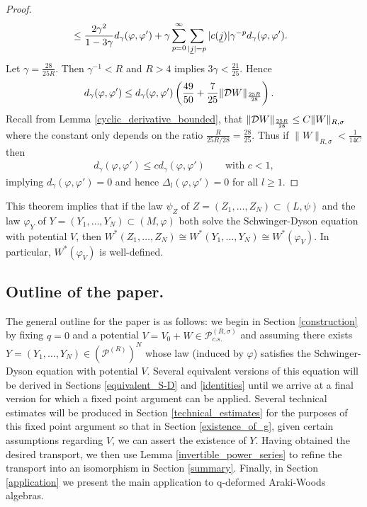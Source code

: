 \begin{proof}
\begin{align*}
				&\leq \frac{2\gamma^2}{1-3\gamma} d_\gamma(\varphi,\varphi') + \gamma\sum_{p=0}^\infty \sum_{|\underline{j}|=p} |c(\underline{j})| \gamma^{-p}d_\gamma(\varphi,\varphi').
	\end{align*}
Let $\gamma=\frac{28}{25 R}$. Then $\gamma^{-1}<R$ and $R>4$ implies $3\gamma<\frac{21}{25}$. Hence
	\begin{align*}
		d_\gamma(\varphi,\varphi')&\leq d_\gamma(\varphi,\varphi')\left(\frac{49}{50} + \frac{7}{25}\|\mathcal D W\|_{\frac{25R}{28}}\right).
	\end{align*}
Recall from Lemma \ref{cyclic_derivative_bounded}, that $\|\mathcal D W\|_{\frac{25R}{28}} \leq C\|W\|_{R,\sigma}$ where the constant only depends on the ratio $\frac{R}{25R/28}=\frac{28}{25}$. Thus if $\|W\|_{R,\sigma} <\frac{1}{14C}$ then
	\begin{align*}
		d_\gamma(\varphi,\varphi') \leq c d_\gamma(\varphi,\varphi')\qquad \text{with }c<1,
	\end{align*}
implying $d_\gamma(\varphi,\varphi')=0$ and hence $\Delta_l(\varphi,\varphi')=0$ for all $l\geq 1$.
\end{proof}

This theorem implies that if the law $\psi_Z$ of $Z=(Z_1,\ldots, Z_N)\subset (L,\psi)$ and the law $\varphi_Y$ of $Y=(Y_1,\ldots, Y_N)\subset (M,\varphi)$ both solve the Schwinger-Dyson equation with potential $V$, then $W^*(Z_1,\ldots, Z_N)\cong W^*(Y_1,\ldots, Y_N)\cong W^*(\varphi_V)$. In particular, $W^*(\varphi_V)$ is well-defined.


\subsection{Outline of the paper.}

The general outline for the paper is as follows: we begin in Section \ref{construction} by fixing $q=0$ and a potential $V=V_0+W\in \mathscr{P}^{(R,\sigma)}_{c.s.}$ and assuming there exists $Y=(Y_1,\ldots, Y_N)\in (\mathscr{P}^{(R)})^N$ whose law (induced by $\varphi$) satisfies the Schwinger-Dyson equation with potential $V$. Several equivalent versions of this equation will be derived in Sections \ref{equivalent_S-D} and \ref{identities} until we arrive at a final version for which a fixed point argument can be applied. Several technical estimates will be produced in Section \ref{technical_estimates} for the purposes of this fixed point argument so that in Section \ref{existence_of_g}, given certain assumptions regarding $V$, we can assert the existence of $Y$. Having obtained the desired transport, we then use Lemma \ref{invertible_power_series} to refine the transport into an isomorphism in Section \ref{summary}. Finally, in Section \ref{application} we present the main application to q-deformed Araki-Woods algebras.


